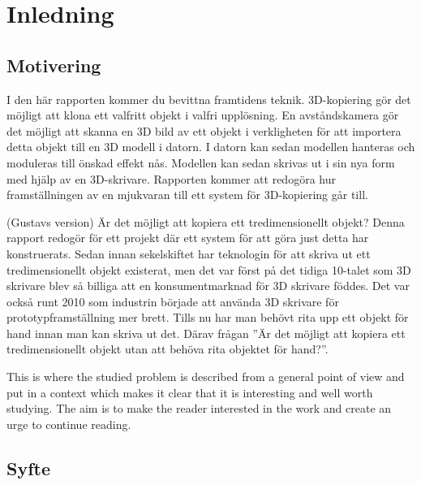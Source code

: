 \chapter{Inledning}
\label{cha:introduction}

\section{Motivering}
\label{sec:motivation}



I den här rapporten kommer du bevittna framtidens teknik. 3D-kopiering gör det möjligt att klona ett valfritt objekt i valfri upplösning. En avståndskamera gör det möjligt att skanna en 3D bild av ett objekt i verkligheten för att importera detta objekt till en 3D modell i datorn. I datorn kan sedan modellen hanteras och moduleras till önskad effekt nås. Modellen kan sedan skrivas ut i sin nya form med hjälp av en 3D-skrivare. Rapporten kommer att redogöra hur framställningen av en mjukvaran till ett system för 3D-kopiering går till.

(Gustavs version)
Är det möjligt att kopiera ett tredimensionellt objekt? Denna rapport redogör för ett projekt där ett system för att göra just detta har konstruerats. 
Sedan innan sekelskiftet har teknologin för att skriva ut ett tredimensionellt objekt existerat, men det var först på det tidiga 10-talet som 3D skrivare blev så billiga att en konsumentmarknad för 3D skrivare föddes. Det var också runt 2010 som industrin började att använda 3D skrivare för prototypframställning mer brett. Tills nu har man behövt rita upp ett objekt för hand innan man kan skriva ut det. Därav frågan ”Är det möjligt att kopiera ett tredimensionellt objekt utan att behöva rita objektet för hand?”.    





\cite{scigen}

This is where the studied problem is described from a general
point of view and put in a context which makes it clear that
it is interesting and well worth studying. The aim is to make
the reader interested in the work and create an urge to
continue reading.

\section{Syfte}
\label{sec:aim}


